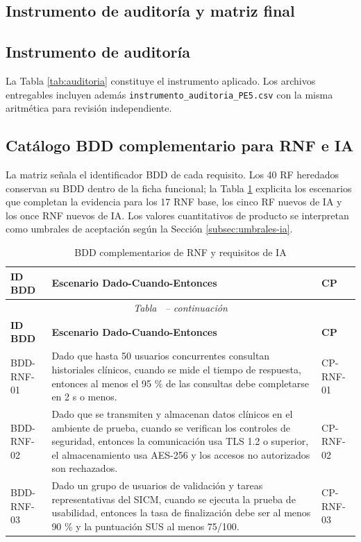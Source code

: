 \documentclass[11pt,a4paper]{article}
\begin{document}
\clearpage
\begin{appendices}
	\section{Instrumento de auditoría y matriz final}
	\subsection{Instrumento de auditoría}
	La Tabla \ref{tab:auditoria} constituye el instrumento aplicado. Los archivos entregables incluyen además \texttt{instrumento\_auditoria\_PE5.csv} con la misma aritmética para revisión independiente.
	
	
	\subsection{Catálogo BDD complementario para RNF e IA}
	La matriz señala el identificador BDD de cada requisito. Los 40 RF heredados conservan su BDD dentro de la ficha funcional; la Tabla \ref{tab:bddcomplementario} explicita los escenarios que completan la evidencia para los 17 RNF base, los cinco RF nuevos de IA y los once RNF nuevos de IA. Los valores cuantitativos de producto se interpretan como umbrales de aceptación según la Sección \ref{subsec:umbrales-ia}.
	\scriptsize
	\begin{longtable}{p{2.8cm}p{10.6cm}p{2cm}}
		\caption{BDD complementarios de RNF y requisitos de IA}\label{tab:bddcomplementario}\\
		\toprule\textbf{ID BDD}&\textbf{Escenario Dado-Cuando-Entonces}&\textbf{CP}\\\midrule
		\endfirsthead
		\multicolumn{3}{c}{\small\textit{Tabla \thetable\ -- continuación}}\\
		\toprule\textbf{ID BDD}&\textbf{Escenario Dado-Cuando-Entonces}&\textbf{CP}\\\midrule
		\endhead
		BDD-RNF-01 & Dado que hasta 50 usuarios concurrentes consultan historiales clínicos, cuando se mide el tiempo de respuesta, entonces al menos el 95 \% de las consultas debe completarse en 2 s o menos. & CP-RNF-01\\
		BDD-RNF-02 & Dado que se transmiten y almacenan datos clínicos en el ambiente de prueba, cuando se verifican los controles de seguridad, entonces la comunicación usa TLS 1.2 o superior, el almacenamiento usa AES-256 y los accesos no autorizados son rechazados. & CP-RNF-02\\
		BDD-RNF-03 & Dado un grupo de usuarios de validación y tareas representativas del SICM, cuando se ejecuta la prueba de usabilidad, entonces la tasa de finalización debe ser al menos 90 \% y la puntuación SUS al menos 75/100. & CP-RNF-03\\

\end{longtable}
\end{appendices}
\end{document}
